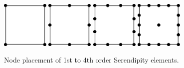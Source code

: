 \documentclass[serif,12pt]{beamer}
\begin{document}
\begin{frame}
	\begin{figure}
	    \includegraphics[width=0.20\textwidth]{figures/r1d2.pdf}
	    \hfill
	    \includegraphics[width=0.20\textwidth]{figures/r2d2.pdf}
	    \hfill
	    \includegraphics[width=0.20\textwidth]{figures/r3d2.pdf}
	    \hfill
	    \includegraphics[width=0.20\textwidth]{figures/r4d2.pdf}
	    \caption{Node placement of 1st to 4th order Serendipity elements.}
	\end{figure}
\end{frame}
\end{document}
